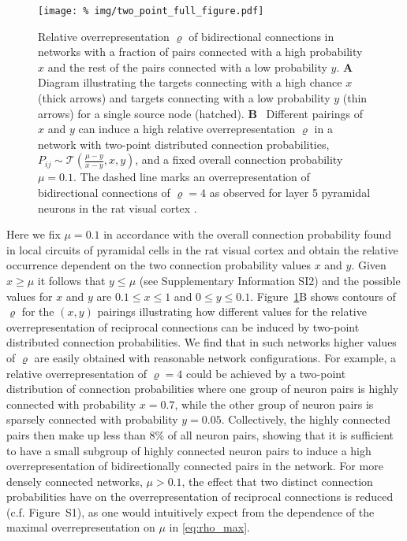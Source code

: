 \begin{figure}[h!]
\centering
\texttt{[image: \%
    img/two\_point\_full\_figure.pdf]}
\caption{Relative overrepresentation $\varrho$ of bidirectional
  connections in networks with a fraction of pairs connected with a
  high probability $x$ and the rest of the pairs connected with a low
  probability $y$. \textbf{A}~ Diagram illustrating the targets
  connecting with a high chance $x$ (thick arrows) and targets
  connecting with a low probability $y$ (thin arrows) for a single
  source node (hatched). \textbf{B}~ Different pairings of $x$ and $y$
  can induce a high relative overrepresentation $\varrho$ in a network
  with two-point distributed connection probabilities, $P_{ij} \sim
  \mathcal{T}(\frac{\mu-y}{x-y},x,y)$, and a fixed overall connection
  probability $\mu = 0.1$. The dashed line marks an overrepresentation
  of bidirectional connections of $\varrho=4$ as observed for layer 5
  pyramidal neurons in the rat visual cortex \cite{Song2005}.}
\label{fig:tp}
\end{figure}

%
Here we fix $\mu = 0.1$ in accordance with the overall connection
probability found in local circuits of pyramidal cells in the rat visual
cortex \cite{Song2005} and obtain the relative occurrence dependent
on the two connection probability values $x$ and $y$.
%
Given $x \geq \mu$ it follows that $y \leq \mu$ (see Supplementary
Information SI2) and the possible values for $x$ and $y$ are $0.1 \leq x
\leq 1$ and $0 \leq y \leq 0.1$.
%
Figure~\ref{fig:tp}B shows contours of $\varrho$ for the $(x,y)$
pairings illustrating how different values for the relative
overrepresentation of reciprocal connections can be induced by
two-point distributed connection probabilities.
%
We find that in such networks higher values of $\varrho$ are easily
obtained with reasonable network configurations. %
%
For example, a relative overrepresentation of $\varrho=4$ could be
achieved by a two-point distribution of connection probabilities where
one group of neuron pairs is highly connected with probability
$x=0.7$, while the other group of neuron pairs is sparsely connected
with probability $y=0.05$.
%
Collectively, the highly connected pairs then make up less than $8\%$
of all neuron pairs, showing that it is sufficient to have a small
subgroup of highly connected neuron pairs to induce a high
overrepresentation of bidirectionally connected pairs in the
network. For more densely connected networks, $\mu>0.1$, the effect that
two distinct connection probabilities have on the overrepresentation
of reciprocal connections is reduced (c.f. Figure~S1), as one would
intuitively expect from the dependence of the maximal
overrepresentation on $\mu$ in \eqref{eq:rho_max}.








